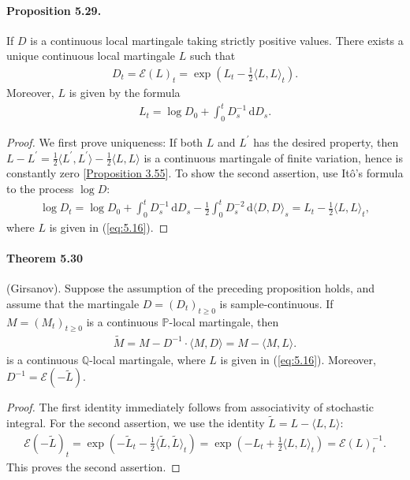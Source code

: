 \documentclass{article}
\numberwithin{equation}{section}
\renewcommand{\P}{\mathbb{P}}
\newcommand{\bbQ}{\mathbb{Q}}
\renewcommand{\d}{\mathrm{d}}
\theoremstyle{plain}
\theoremstyle{definition}
\begin{document}
\paragraph{Proposition 5.29.\label{prop:5.29}} If $D$ is a continuous local martingale taking strictly positive values. There exists a unique continuous local martingale $L$ such that
\begin{align*}
D_t=\mathscr{E}(L)_t = \exp\left(L_t-\frac{1}{2}\langle L,L\rangle_t\right).
\end{align*}
Moreover, $L$ is given by the formula
\begin{align*}
	L_t=\log D_0+\int_0^t D_s^{-1}\,\d D_s.\tag{5.16}\label{eq:5.16}
\end{align*}
\begin{proof} 
We first prove uniqueness: If both $L$ and $L^\prime$ has the desired property, then $L-L^\prime=\frac{1}{2}\langle L^\prime,L^\prime\rangle - \frac{1}{2}\langle L,L\rangle$ is a continuous martingale of finite variation, hence is constantly zero [\hyperref[prop:3.55]{Proposition 3.55}]. To show the second assertion, use Itô's formula to the process $\log D$:
\begin{align*}
	\log D_t = \log D_0 + \int_0^t D_s^{-1}\,\d D_s - \frac{1}{2}\int_0^t D_s^{-2}\,\d\langle D,D\rangle_s = L_t-\frac{1}{2}\langle L,L\rangle_t,
\end{align*}
where $L$ is given in (\ref{eq:5.16}).
\end{proof}

\paragraph{Theorem 5.30\label{thm:5.30}} (Girsanov). Suppose the assumption of the preceding proposition holds, and assume that the martingale $D=(D_t)_{t\geq 0}$ is sample-continuous. If $M=(M_t)_{t\geq 0}$ is a continuous $\P$-local martingale, then
\begin{align*}
	\widetilde{M} = M - D^{-1}\cdot \langle M,D\rangle = M - \langle M,L\rangle.
\end{align*}
is a continuous $\bbQ$-local martingale, where $L$ is given in (\ref{eq:5.16}). Moreover, $D^{-1}=\mathscr{E}(-\widetilde{L})$.
\begin{proof}
The first identity immediately follows from associativity of stochastic integral. For the second assertion, we use the identity $\widetilde{L}=L-\langle L,L\rangle$:
\begin{align*}
	\mathscr{E}(-\widetilde{L})_t=\exp\left(-\widetilde{L}_t-\frac{1}{2}\langle \widetilde{L},\widetilde{L}\rangle_t\right)=\exp\left(-L_t+\frac{1}{2}\langle L,L\rangle_t\right)=\mathscr{E}(L)_t^{-1}.
\end{align*}
This proves the second assertion.
\end{proof}
\end{document}
